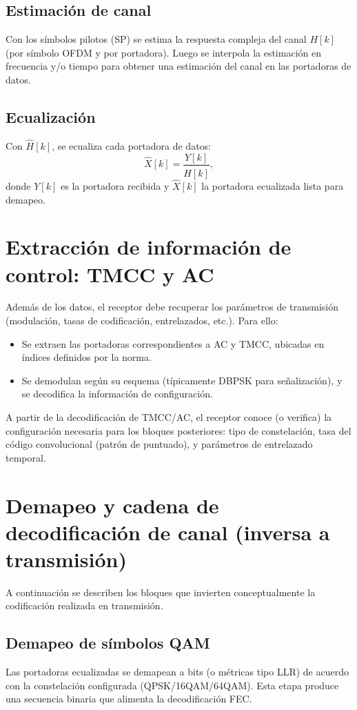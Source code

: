 \subsection{Estimación de canal}
Con los símbolos pilotos (SP) se estima la respuesta compleja del canal
$H[k]$ (por símbolo OFDM y por portadora). Luego se interpola la estimación
en frecuencia y/o tiempo para obtener una estimación del canal en las portadoras de datos.

\subsection{Ecualización}
Con $\widehat{H}[k]$, se ecualiza cada portadora de datos:
\[
\widehat{X}[k] = \frac{Y[k]}{\widehat{H}[k]},
\]
donde $Y[k]$ es la portadora recibida y $\widehat{X}[k]$ la portadora ecualizada
lista para demapeo.

\section{Extracción de información de control: TMCC y AC}
\label{sec:rx_tmcc_ac}

Además de los datos, el receptor debe recuperar los parámetros de transmisión
(modulación, tasas de codificación, entrelazados, etc.). Para ello:
\begin{itemize}
	\item Se extraen las portadoras correspondientes a AC y TMCC, ubicadas en índices
	definidos por la norma.
	\item Se demodulan según su esquema (típicamente DBPSK para señalización),
	y se decodifica la información de configuración.
\end{itemize}
A partir de la decodificación de TMCC/AC, el receptor conoce (o verifica) la configuración
necesaria para los bloques posteriores: tipo de constelación, tasa del código convolucional
(patrón de puntuado), y parámetros de entrelazado temporal.

\section{Demapeo y cadena de decodificación de canal (inversa a transmisión)}
\label{sec:rx_fec_chain}

A continuación se describen los bloques que invierten conceptualmente la codificación
realizada en transmisión.

\subsection{Demapeo de símbolos QAM}
Las portadoras ecualizadas se demapean a bits (o métricas tipo LLR) de acuerdo con la
constelación configurada (QPSK/16QAM/64QAM). Esta etapa produce una secuencia binaria
que alimenta la decodificación FEC.

